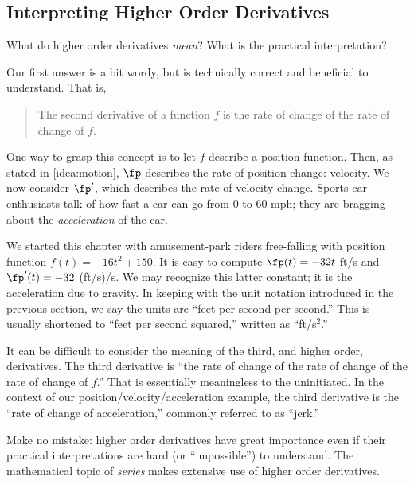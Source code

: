 \subsection{Interpreting Higher Order Derivatives}

What do higher order derivatives \emph{mean}? What is the practical interpretation? 

Our first answer is a bit wordy, but is technically correct and beneficial to understand. That is,
	\begin{quote}
	The second derivative of a function $f$ is the rate of change of the rate of change of $f$.
	\end{quote}

One way to grasp this concept is to let $f$ describe a position function. Then, as stated in \autoref{idea:motion}, $\fp$ describes the rate of position change: velocity. We now consider $\fp'$, which describes the rate of velocity change. Sports car enthusiasts talk of how fast a car can go from 0 to 60 mph; they are bragging about the \emph{acceleration} of the car.

We started this chapter with amusement-park riders free-falling with position function $f(t) = -16t^2+150$. It is easy to compute $\fp(t)=-32t$ ft/s and $\fp'(t) = -32$ (ft/s)/s. We may recognize this latter constant; it is the acceleration due to gravity. In keeping with the unit notation introduced in the previous section, we say the units are ``feet per second per second.'' This is usually shortened to ``feet per second squared,'' written as ``ft/s$^2$.''

It can be difficult to consider the meaning of the third, and higher order, derivatives. The third derivative is ``the rate of change of the rate of change of the rate of change of $f$.'' That is essentially meaningless to the uninitiated. In the context of our position/velocity/acceleration example, the third derivative is the ``rate of change of acceleration,'' commonly referred to as ``jerk.'' 

Make no mistake: higher order derivatives have great importance even if their practical interpretations are hard (or ``impossible'') to understand. The mathematical topic of \emph{series} makes extensive use of higher order derivatives.


